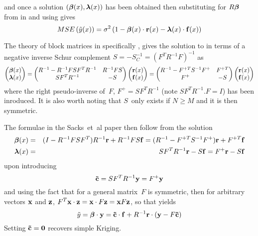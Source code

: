 and once a solution $(\mbox{\boldmath ${\beta}$}(x), \mbox{\boldmath ${\lambda}$}(x))$ has been obtained then substituting for $R \mbox{\boldmath ${\beta}$}$
from  in  and using  gives
\begin{equation}\label{eq:msendsub}
MSE\left(\tilde{y}(x)\right) = \sigma^2\left(1 - \mbox{\boldmath ${\beta}$}(x) \cdot{\bf r}(x) - \mbox{\boldmath ${\lambda}$}(x) \cdot{\bf f}(x) \right) 
\end{equation}

The theory of block matrices in  specifically , gives the solution to 
in terms of a negative inverse Schur complement $S = -S_C^{-1} = (F^TR^{-1}F)^{-1}$ as
\begin{equation}\label{eq:endsol}
\begin{pmatrix}
\mbox{\boldmath ${\beta}$}(x) \\
\mbox{\boldmath ${\lambda}$}(x)
\end{pmatrix}
=
\begin{pmatrix}
R^{-1} - R^{-1}FSF^T R^{-1} & R^{-1} FS \\
SF^TR^{-1} & -S
\end{pmatrix}
\begin{pmatrix}
{\bf r}(x) \\
{\bf f}(x)
\end{pmatrix}
=
\begin{pmatrix}
R^{-1} - F^{+T}S^{-1}F^+ &  F^{+T}\\
F^+ & -S
\end{pmatrix}
\begin{pmatrix}
{\bf r}(x) \\
{\bf f}(x)
\end{pmatrix}
\end{equation}
where the right pseudo-inverse of~$F$, $F^+=SF^TR^{-1}$ (note $SF^TR^{-1}. F = I$) has been inroduced.
It is also worth noting that $S$~only exists if $N\geq M$ and it is then symmetric.

The formulae in the Sacks~et~al paper then follow from the solution
\begin{eqnarray}\label{eq:betasol}
\mbox{\boldmath ${\beta}$}(x) &=& (I - R^{-1}FSF^T) R^{-1} {\bf r} +R^{-1} FS {\bf f}  = (R^{-1} - F^{+T}S^{-1}F^+) {\bf r} + F^{+T} {\bf f} \\  
\mbox{\boldmath ${\lambda}$}(x) &=& SF^TR^{-1} {\bf r} -S {\bf f} = F^+ {\bf r} -S {\bf f} \label{eq:lambdasol}
\end{eqnarray}
upon introducing
\begin{equation}\label{eq:ctilde}
{\bf \tilde{c}}= SF^TR^{-1}{\bf y} = F^+ {\bf y}
\end{equation}
and using the fact that for a general matrix~$F$ is symmetric, then for arbitrary vectors ${\bf x}$
and ${\bf z}$, $F^T {\bf x} \cdot {\bf z}= {\bf x} \cdot F {\bf z} = {\bf x} F {\bf z}$, so that
  yields
\begin{equation}\label{eq:ytilde}
\tilde{y}= \mbox{\boldmath ${\beta}$} \cdot {\bf y} = {\bf \tilde{c}} \cdot {\bf f} +
  R^{-1} {\bf r} \cdot ({\bf y}-F {\bf \tilde{c}})
\end{equation}
Setting ${\bf \tilde{c}}= {\bf 0}$ recovers simple Kriging.
 
